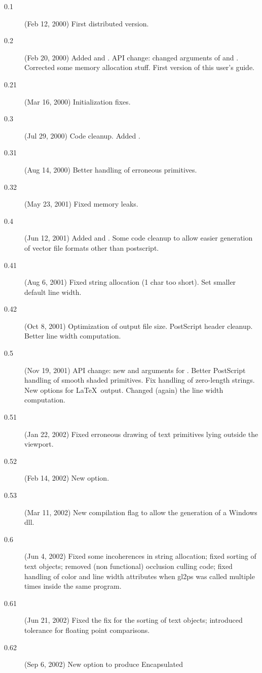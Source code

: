 \begin{description}
\item[0.1] (Feb 12, 2000) First distributed version.
\item[0.2] (Feb 20, 2000) Added  and
  . API change: changed arguments of 
  and . Corrected some memory allocation stuff. First version
  of this user's guide.
\item[0.21] (Mar 16, 2000) Initialization fixes.
\item[0.3] (Jul 29, 2000) Code cleanup. Added .
\item[0.31] (Aug 14, 2000) Better handling of erroneous primitives.
\item[0.32] (May 23, 2001) Fixed memory leaks.
\item[0.4] (Jun 12, 2001) Added  and
  . Some code cleanup to allow easier generation of
  vector file formats other than postscript.
\item[0.41] (Aug 6, 2001) Fixed string allocation (1 char too short). Set
  smaller default line width.
\item[0.42] (Oct 8, 2001) Optimization of output file size. PostScript
  header cleanup. Better line width computation.
\item[0.5] (Nov 19, 2001) API change: new  and 
  arguments for . Better PostScript handling of smooth
  shaded primitives. Fix handling of zero-length strings. New options for
  \LaTeX\ output. Changed (again) the line width computation.
\item[0.51] (Jan 22, 2002) Fixed erroneous drawing of text primitives lying
  outside the viewport.
\item[0.52] (Feb 14, 2002) New  option.
\item[0.53] (Mar 11, 2002) New  compilation flag to allow the
  generation of a Windows dll.
\item[0.6] (Jun 4, 2002) Fixed some incoherences in string allocation; fixed
  sorting of text objects; removed (non functional) occlusion culling code;
  fixed handling of color and line width attributes when gl2ps was called
  multiple times inside the same program.
\item[0.61] (Jun 21, 2002) Fixed the fix for the sorting of text objects;
  introduced tolerance for floating point comparisons.
\item[0.62] (Sep 6, 2002) New  option to produce Encapsulated

\end{description}
